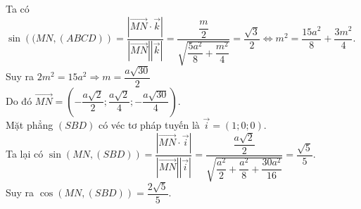 \begin{ex}
{		Ta có $\sin\left((MN,(ABCD)\right)=\dfrac{\left|\overrightarrow{MN}\cdot\overrightarrow{k} \right|}{\left|\overrightarrow{MN} \right|\left|\overrightarrow{k} \right|} =\dfrac{\dfrac{m}{2}}{\sqrt{\dfrac{5a^2}{8}+\dfrac{m^2}{4}}} =\dfrac{\sqrt{3}}{2} \Leftrightarrow m^2=\dfrac{15a^2}{8}+\dfrac{3m^2}{4}$.\\
		Suy ra $2m^2=15a^2 \Rightarrow m=\dfrac{a\sqrt{30}}{2}$ \\
		Do đó $\overrightarrow{MN} =\left(-\dfrac{a\sqrt{2}}{2};\dfrac{a\sqrt{2}}{4};-\dfrac{a\sqrt{30}}{4}\right)$.\\
		Mặt phẳng $(SBD)$ có véc tơ pháp tuyến là $\overrightarrow{i}=(1;0;0)$.\\
		Ta lại có $\sin\left(MN,(SBD)\right) =\dfrac{\left|\overrightarrow{MN}\cdot\overrightarrow{i}\right|}{\left|\overrightarrow{MN}\right|\left|\overrightarrow{i}\right|} =\dfrac{\dfrac{a\sqrt{2}}{2}}{\sqrt{\dfrac{a^2}{2}+\dfrac{a^2}{8}+\dfrac{30a^2}{16}}} =\dfrac{\sqrt{5}}{5}$.\\
		Suy ra $\cos\left(MN,(SBD)\right) =\dfrac{2\sqrt{5}}{5}$.
	}
\end{ex}

